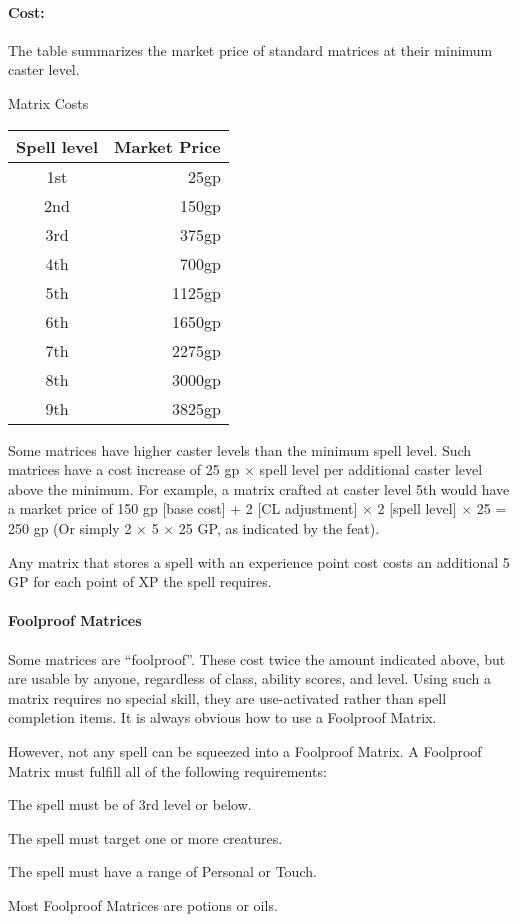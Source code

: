 \paragraph{Cost:} The  table summarizes the market price of standard matrices at their minimum caster level.
\begin{tableonecolumn}
\caption{Matrix Costs}
\label{tab:MatrixCosts}
\begin{tabular}{|c|r|}
\hline
\textbf{Spell level}&\textbf{Market Price}\\
\hline
1st&	25gp	\\
2nd&	150gp	\\
3rd&	375gp	\\
4th&	700gp	\\
5th&	1125gp	\\
6th&	1650gp	\\
7th&	2275gp	\\
8th&	3000gp	\\
9th&	3825gp	\\
\hline
\end{tabular}
\end{tableonecolumn}
Some matrices have higher caster levels than the minimum spell level. Such matrices have a cost increase of 25 gp $\times$ spell level per additional caster level above the minimum. For example, a  matrix crafted at caster level 5th would have a market price of 150 gp [base cost] + 2 [CL adjustment] $\times$ 2 [spell level] $\times$ 25 = 250 gp (Or simply 2 $\times$ 5 $\times$ 25 GP, as indicated by the  feat).

Any matrix that stores a spell with an experience point cost costs an additional 5 GP for each point of XP the spell requires.
\paragraph{Foolproof Matrices}
\label{Item:FoolproofMatrices}
Some matrices are ``foolproof''. These cost twice the amount indicated above, but are usable by anyone, regardless of class, ability scores, and level.
Using such a matrix requires no special skill, they are use-activated rather than spell completion items.
It is always obvious how to use a Foolproof Matrix.

However, not any spell can be squeezed into a Foolproof Matrix. A Foolproof Matrix must fulfill all of the following requirements:
\begin{list}{}{\leftmargin=1em}
 \item The spell must be of 3rd level or below.
 \item The spell must target one or more creatures.
 \item The spell must have a range of Personal or Touch.
\end{list}
Most Foolproof Matrices are potions or oils.
